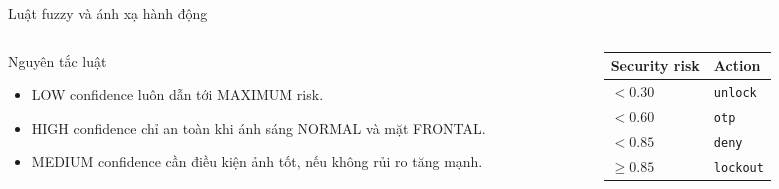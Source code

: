 \documentclass[aspectratio=169,11pt]{beamer}
\newcommand{\code}[1]{\texttt{\small #1}}
\begin{document}
\begin{frame}{Luật fuzzy và ánh xạ hành động}
    \begin{columns}[T]
        \begin{column}{0.52\textwidth}
            \begin{block}{Nguyên tắc luật}
                \begin{itemize}
                    \item LOW confidence luôn dẫn tới MAXIMUM risk.
                    \item HIGH confidence chỉ an toàn khi ánh sáng NORMAL và mặt FRONTAL.
                    \item MEDIUM confidence cần điều kiện ảnh tốt, nếu không rủi ro tăng mạnh.
                \end{itemize}
            \end{block}
        \end{column}
        \begin{column}{0.43\textwidth}
            \begin{table}
                \centering
                \small
                \begin{tabular}{@{}ll@{}}
                    \toprule
                    \textbf{Security risk} & \textbf{Action}\\
                    \midrule
                    $<0.30$ & \code{unlock}\\
                    $<0.60$ & \code{otp}\\
                    $<0.85$ & \code{deny}\\
                    $\ge 0.85$ & \code{lockout}\\
                    \bottomrule
                \end{tabular}
            \end{table}
        \end{column}
    \end{columns}
\end{frame}
\end{document}
